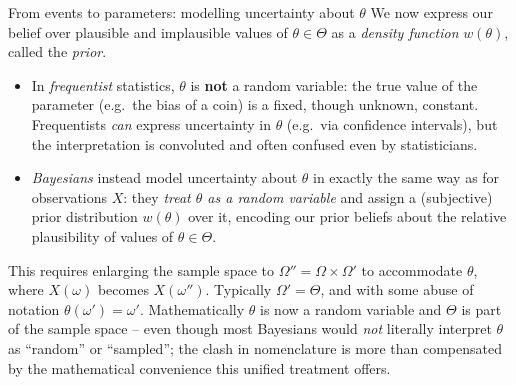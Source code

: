 \documentclass[aspectratio=169,10pt]{beamer}
\begin{document}
\begin{frame}{From events to parameters: modelling uncertainty about $\theta$}
  We now express our belief over plausible and implausible values of
  $\theta\in\Theta$ as a \emph{density function} $w(\theta)$, called the
  \emph{prior}.

  \begin{itemize}
    \item In \emph{frequentist} statistics, $\theta$ is \textbf{not} a
      random variable: the true value of the parameter (e.g.\ the bias of a
      coin) is a fixed, though unknown, constant. Frequentists \emph{can}
      express uncertainty in $\theta$ (e.g.\ via confidence intervals), but
      the interpretation is convoluted and often confused even by
      statisticians.
    \item \emph{Bayesians} instead model uncertainty about $\theta$ in
      exactly the same way as for observations $X$: they \emph{treat $\theta$
      as a random variable} and assign a (subjective) prior distribution
      $w(\theta)$ over it, encoding our prior beliefs about the relative
      plausibility of values of $\theta\in\Theta$.
  \end{itemize}

  This requires enlarging the sample space to
  $\Omega''=\Omega\times\Omega'$ to accommodate $\theta$, where $X(\omega)$
  becomes $X(\omega'')$. Typically $\Omega'=\Theta$, and with some abuse of
  notation $\theta(\omega')=\omega'$. Mathematically $\theta$ is now a random
  variable and $\Theta$ is part of the sample space -- even though most
  Bayesians would \emph{not} literally interpret $\theta$ as ``random'' or
  ``sampled''; the clash in nomenclature is more than compensated by the
  mathematical convenience this unified treatment offers.
\end{frame}
\end{document}

